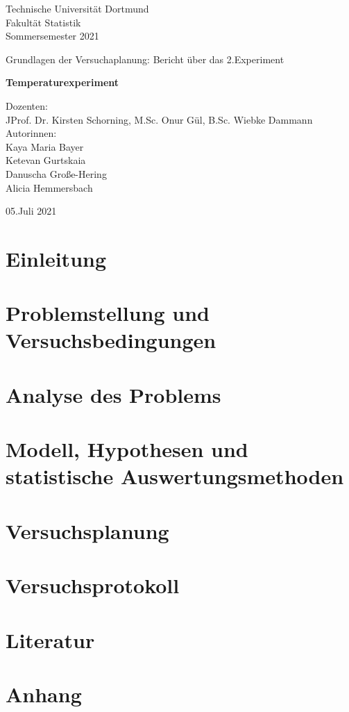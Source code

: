 \documentclass[ ngerman, fontsize= 12pt, paper=a4, headings=big, titlepage=true]{article}
\begin{document}
	
	
\begin{center}
	\Large
	Technische Universität Dortmund\\
	Fakultät Statistik\\
	Sommersemester 2021\\
	
	\vspace{4em}
	
	Grundlagen der Versuchaplanung: Bericht über das 2.Experiment
	
	\Huge
	\textbf{Temperaturexperiment}
	
	\Large
	\vspace{5em}
	Dozenten:\\
	JProf. Dr. Kirsten Schorning, M.Sc. Onur Gül, B.Sc. Wiebke Dammann\\
	
	
	\vspace{3em}
	Autorinnen: \\
	Kaya Maria Bayer\\
	Ketevan Gurtskaia\\
    Danuscha Große-Hering\\	
	Alicia Hemmersbach\\

	
	
	\vspace{4em}
	
	05.Juli 2021
	
\end{center}

\newpage	

\tableofcontents
\newpage

\section{Einleitung}
\section{Problemstellung und Versuchsbedingungen}
\section{Analyse des Problems}
\section{Modell, Hypothesen und statistische Auswertungsmethoden}
\section{Versuchsplanung}
\cite{aristotle:physics}
\section{Versuchsprotokoll}

\section{Literatur}
 



\section{Anhang}
	
	
	
\end{document}
